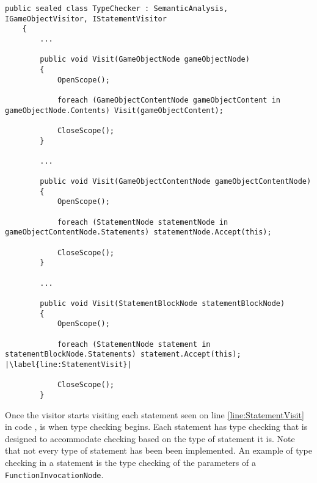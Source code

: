 \begin{lstlisting}[language=CSharp, caption={Applying Scope to GameObjects, GameObjectContents and StatementBlocks}, label={lst:ApplyScope},escapechar=|]
    public sealed class TypeChecker : SemanticAnalysis, IGameObjectVisitor, IStatementVisitor
    {
        ...

        public void Visit(GameObjectNode gameObjectNode)
        {
            OpenScope();

            foreach (GameObjectContentNode gameObjectContent in gameObjectNode.Contents) Visit(gameObjectContent);

            CloseScope();
        }

        ...

        public void Visit(GameObjectContentNode gameObjectContentNode)
        {
            OpenScope();

            foreach (StatementNode statementNode in gameObjectContentNode.Statements) statementNode.Accept(this);

            CloseScope();
        }

        ... 

        public void Visit(StatementBlockNode statementBlockNode)
        {
            OpenScope();

            foreach (StatementNode statement in statementBlockNode.Statements) statement.Accept(this); |\label{line:StatementVisit}|

            CloseScope();
        }
\end{lstlisting}

Once the visitor starts visiting each statement seen on line \ref{line:StatementVisit} in code , is when type checking begins. Each statement has type checking that is designed to accommodate checking based on the type of statement it is. Note that not every type of statement has been been implemented.
An example of type checking in a statement is the type checking of the parameters of a \texttt{FunctionInvocationNode}. 
